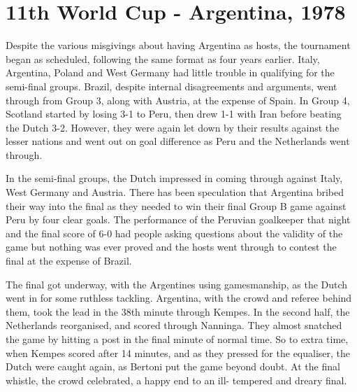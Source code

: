 \section{11th World Cup - Argentina, 1978}
Despite the various misgivings about having Argentina as hosts, the tournament
began as scheduled, following the same format as four years earlier. Italy, 
Argentina, Poland and West Germany had little trouble in qualifying for the 
semi-final groups. Brazil, despite internal disagreements and arguments, went 
through from Group 3, along with Austria, at the expense of Spain. In Group 4,
Scotland started by losing 3-1 to Peru, then drew 1-1 with Iran before beating
the Dutch 3-2. However, they were again let down by their results against the 
lesser nations and went out on goal difference as Peru and the Netherlands went
through.

In the semi-final groups, the Dutch impressed in coming through against Italy, 
West Germany and Austria. There has been speculation that Argentina bribed 
their way into the final as they needed to win their final Group B game against
Peru by four clear goals. The performance of the Peruvian goalkeeper that night
and the final score of 6-0 had people asking questions about the validity of 
the game but nothing was ever proved and the hosts went through to contest the 
final at the expense of Brazil.

The final got underway, with the Argentines using gamesmanship, as the Dutch 
went in for some ruthless tackling. Argentina, with the crowd and referee 
behind them, took the lead in the 38th minute through Kempes. In the second 
half, the Netherlands reorganised, and scored through Nanninga. They almost 
snatched the game by hitting a post in the final minute of normal time.
So to extra time, when Kempes scored after 14 minutes, and as they pressed for 
the equaliser, the Dutch were caught again, as Bertoni put the game beyond 
doubt. At the final whistle, the crowd celebrated, a happy end to an ill-
tempered and dreary final.
